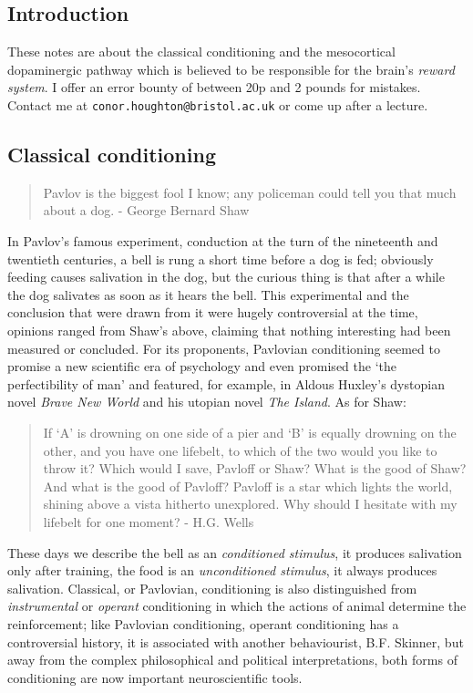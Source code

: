 \documentclass[11pt,a4paper]{scrartcl}
\begin{document}
\subsection*{Introduction}
These notes are about the classical conditioning and the mesocortical
dopaminergic pathway which is believed to be responsible for the
brain's \textsl{reward system}. I offer an error bounty of
between 20p and 2 pounds for mistakes. Contact me at
\texttt{conor.houghton@bristol.ac.uk} or come up after a lecture.

\subsection*{Classical conditioning}

\begin{quote}
Pavlov is the biggest fool I know; any policeman could tell you that much
about a dog. - George Bernard Shaw
\end{quote}

In Pavlov's famous experiment, conduction at the turn of the
nineteenth and twentieth centuries, a bell is rung a short time before
a dog is fed; obviously feeding causes salivation in the dog, but the
curious thing is that after a while the dog salivates as soon as it
hears the bell. This experimental and the conclusion that were drawn
from it were hugely controversial at the time, opinions ranged from
Shaw's above, claiming that nothing interesting had been measured or
concluded.  For its proponents, Pavlovian conditioning seemed to
promise a new scientific era of psychology and even promised the \lq{}the perfectibility of man\rq{} and featured, for example, in Aldous Huxley's dystopian novel \textsl{Brave New World} and his utopian novel \textsl{The Island}. As for Shaw:
\begin{quote}
If ‘A’ is drowning on one side of a pier and ‘B’ is equally drowning on the
other, and you have one lifebelt, to which of the two would you like to throw
it? Which would I save, Pavloff or Shaw? What is the good of Shaw? And
what is the good of Pavloff? Pavloff is a star which lights the world, shining
above a vista hitherto unexplored. Why should I hesitate with my lifebelt for
one moment? - H.G. Wells
\end{quote}

These days we describe the bell as an \textsl{conditioned stimulus},
it produces salivation only after training, the food is an
\textsl{unconditioned stimulus}, it always produces
salivation. Classical, or Pavlovian, conditioning is also
distinguished from \textsl{instrumental} or \textsl{operant}
conditioning in which the actions of animal determine the
reinforcement; like Pavlovian conditioning, operant conditioning has a
controversial history, it is associated with another behaviourist,
B.F. Skinner, but away from the complex philosophical and political
interpretations, both forms of conditioning are now important neuroscientific tools.
\end{document}
